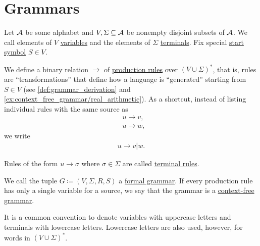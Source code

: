 \section{Grammars}\label{sec:grammars}

\begin{definition}\label{def:grammar}\cite[definition 2.2]{Sipser2013}
  Let $\mathcal A$ be some alphabet and $V, \Sigma \subseteq \mathcal A$ be nonempty disjoint subsets of $\mathcal A$. We call elements of $V$ \ul{variables} and the elements of $\Sigma$ \ul{terminals}. Fix special \ul{start symbol} $S \in V$.

  We define a binary relation $\to$ of \ul{production rules} over $(V \cup \Sigma)^*$, that is, rules are \enquote{transformations} that define how a language is \enquote{generated} starting from $S \in V$ (see \cref{def:grammar_derivation} and \cref{ex:context_free_grammar/real_arithmetic}). As a shortcut, instead of listing individual rules with the same source as
  \begin{align*}
    &u \to v, \\
    &u \to w,
  \end{align*}
  we write
  \begin{align*}
    u \to v | w.
  \end{align*}

  Rules of the form $u \to \sigma$ where $\sigma \in \Sigma$ are called \ul{terminal rules}.

  We call the tuple $G \coloneqq (V, \Sigma, R, S)$ a \ul{formal grammar}. If every production rule has only a single variable for a source, we say that the grammar is a \ul{context-free grammar}.
\end{definition}

\begin{note}\label{note:grammar_symbol_case}
  It is a common convention to denote variables with uppercase letters and terminals with lowercase letters. Lowercase letters are also used, however, for words in $(V \cup \Sigma)^*$.
\end{note}

